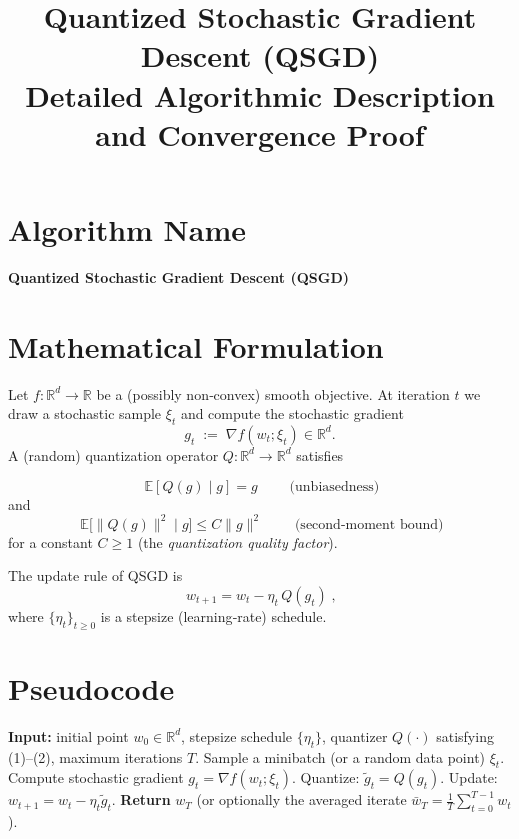 \documentclass{article}
\newcommand{\E}{\mathbb{E}}
\newcommand{\R}{\mathbb{R}}
\begin{document}
\title{Quantized Stochastic Gradient Descent (QSGD) \\ Detailed Algorithmic Description and Convergence Proof}
\author{}
\date{}
\maketitle

\section*{Algorithm Name}
\textbf{Quantized Stochastic Gradient Descent (QSGD)}

\section*{Mathematical Formulation}
Let $f:\R^{d}\rightarrow \R$ be a (possibly non‑convex) smooth objective.  
At iteration $t$ we draw a stochastic sample $\xi_t$ and compute the stochastic
gradient
\[
g_t \;:=\; \nabla f(w_t;\xi_t)\in\R^{d}.
\]
A (random) quantization operator $Q:\R^d\to\R^d$ satisfies

\[
\boxed{\;\E[Q(g)\mid g]=g\;}\qquad\text{(unbiasedness)} \tag{1}
\]
and
\[
\boxed{\;\E\!\big[\|Q(g)\|^{2}\mid g\big]\le C\|g\|^{2}\;}\qquad\text{(second‑moment bound)} \tag{2}
\]
for a constant $C\ge 1$ (the \emph{quantization quality factor}).

The update rule of QSGD is
\[
\boxed{\; w_{t+1}=w_t-\eta_t\,Q(g_t)\;}, \tag{3}
\]
where $\{\eta_t\}_{t\ge0}$ is a stepsize (learning‑rate) schedule.

\section*{Pseudocode}
\begin{algorithm}[H]
\caption{Quantized Stochastic Gradient Descent (QSGD)}
\begin{algorithmic}[1]
\STATE \textbf{Input:} initial point $w_0\in\R^{d}$, stepsize schedule $\{\eta_t\}$, 
quantizer $Q(\cdot)$ satisfying (1)–(2), maximum iterations $T$.
    \STATE Sample a minibatch (or a random data point) $\xi_t$.
    \STATE Compute stochastic gradient $g_t=\nabla f(w_t;\xi_t)$.
    \STATE Quantize: $\tilde g_t = Q(g_t)$.
    \STATE Update: $w_{t+1}=w_t-\eta_t \tilde g_t$.
\ENDFOR
\STATE \textbf{Return} $w_T$ (or optionally the averaged iterate $\bar w_T=\frac1T\sum_{t=0}^{T-1}w_t$).
\end{algorithmic}
\end{algorithm}
\end{document}
